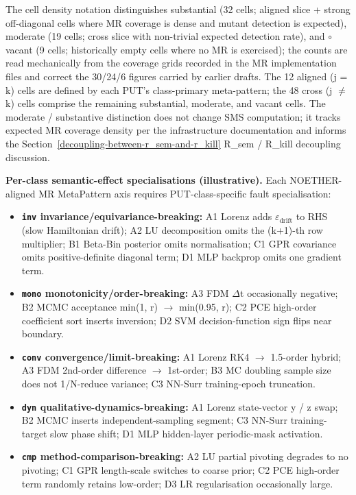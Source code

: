 \documentclass[manuscript,screen,review]{acmart}
\begin{document}
The cell density notation distinguishes \textbullet\textbullet substantial (32 cells;
aligned slice + strong off-diagonal cells where MR coverage is dense and
mutant detection is expected), \textbullet moderate (19 cells; cross slice with
non-trivial expected detection rate), and $\circ$ vacant (9 cells;
historically empty cells where no MR is exercised); the counts are
read mechanically from the coverage grids recorded in the MR
implementation files and correct the 30/24/6 figures carried by
earlier drafts. The 12
aligned (j = k) cells are defined by each PUT's class-primary
meta-pattern; the 48 cross
(j $\neq$ k) cells comprise the remaining substantial, moderate, and
vacant cells. The \textbullet moderate / \textbullet\textbullet substantive
distinction does not change SMS computation; it tracks expected MR
coverage density per the infrastructure documentation and informs the Section~\ref{decoupling-between-r_sem-and-r_kill} R\_sem /
R\_kill decoupling discussion.

\textbf{Per-class semantic-effect specialisations (illustrative).} Each
NOETHER-aligned MR MetaPattern axis requires PUT-class-specific fault
specialisation:

\begin{itemize}

\item
  \textbf{\texttt{inv} invariance/equivariance-breaking:} A1 Lorenz adds $\varepsilon_{\mathrm{drift}}$ to RHS
  (slow Hamiltonian drift); A2 LU decomposition omits the (k+1)-th row
  multiplier; B1 Beta-Bin posterior omits normalisation; C1 GPR
  covariance omits positive-definite diagonal term; D1 MLP backprop
  omits one gradient term.
\item
  \textbf{\texttt{mono} monotonicity/order-breaking:} A3 FDM $\Delta$t occasionally
  negative; B2 MCMC acceptance min(1, r) $\to$ min(0.95, r); C2 PCE
  high-order coefficient sort inserts inversion; D2 SVM
  decision-function sign flips near boundary.
\item
  \textbf{\texttt{conv} convergence/limit-breaking:} A1 Lorenz RK4 $\to$ 1.5-order
  hybrid; A3 FDM 2nd-order difference $\to$ 1st-order; B3 MC doubling sample
  size does not 1/N-reduce variance; C3 NN-Surr training-epoch
  truncation.
\item
  \textbf{\texttt{dyn} qualitative-dynamics-breaking:} A1 Lorenz state-vector y / z
  swap; B2 MCMC inserts independent-sampling segment; C3 NN-Surr
  training-target slow phase shift; D1 MLP hidden-layer periodic-mask
  activation.
\item
  \textbf{\texttt{cmp} method-comparison-breaking:} A2 LU partial pivoting
  degrades to no pivoting; C1 GPR length-scale switches to coarse prior;
  C2 PCE high-order term randomly retains low-order; D3 LR
  regularisation occasionally large.
\end{itemize}
\end{document}
